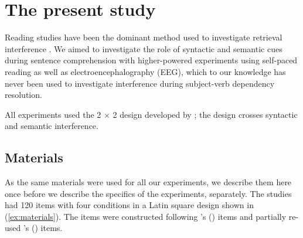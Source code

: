 \documentclass[a4paper, man, floatsintext]{apa7}
\begin{document}
\section{The present study}

Reading studies have been the dominant method used to investigate retrieval interference \parencite[see the review in][]{jaeger_etal_2017}.  We aimed to investigate the role of syntactic and semantic cues during sentence comprehension with higher-powered experiments using  self-paced reading as well as electroencephalography (EEG), which to our knowledge has never been used to investigate interference during subject-verb dependency resolution.

All experiments used the 2 $\times$ 2 design developed by \textcite{vandyke07}; the design crosses syntactic and semantic interference. 

\subsection{Materials}

As the same materials were used for all our experiments, we describe them here once before we describe the specifics of the experiments, separately. The studies had 120 items with four conditions in a Latin square design shown in (\ref{ex:materials}). The items were constructed following \citeauthor{vandyke07}'s (\citeyear{vandyke07}) items and partially re-used  \citeauthor{mertzen}'s (\citeyear{mertzen}) items.
\end{document}
